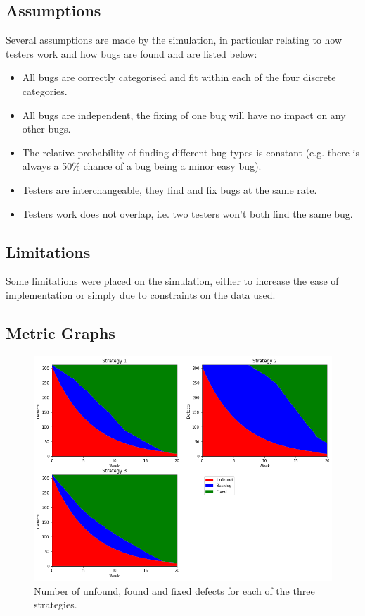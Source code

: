 \documentclass[12pt,a4paper]{article}
\begin{document}
	\subsection{Assumptions}
	
		Several assumptions are made by the simulation, in particular relating to how testers work and how bugs are found and are listed below:
		\begin{itemize}
			\item All bugs are correctly categorised and fit within each of the four discrete categories.
			\item All bugs are independent, the fixing of one bug will have no impact on any other bugs.
			\item The relative probability of finding different bug types is constant (e.g. there is always a 50\% chance of a bug being a minor easy bug).
			\item Testers are interchangeable, they find and fix bugs at the same rate.
			\item Testers work does not overlap, i.e. two testers won't both find the same bug.
		\end{itemize}
	
	
	\subsection{Limitations}
		
		Some limitations were placed on the simulation, either to increase the ease of implementation or simply due to constraints on the data used.



	\newpage
	\subsection{Metric Graphs}                         

	\begin{figure}[h!]
		\centering
		\includegraphics[scale=0.6]{sim_bug_finding}
		\caption{Number of unfound, found and fixed defects for each of the three strategies.}
	\end{figure}
\end{document}
